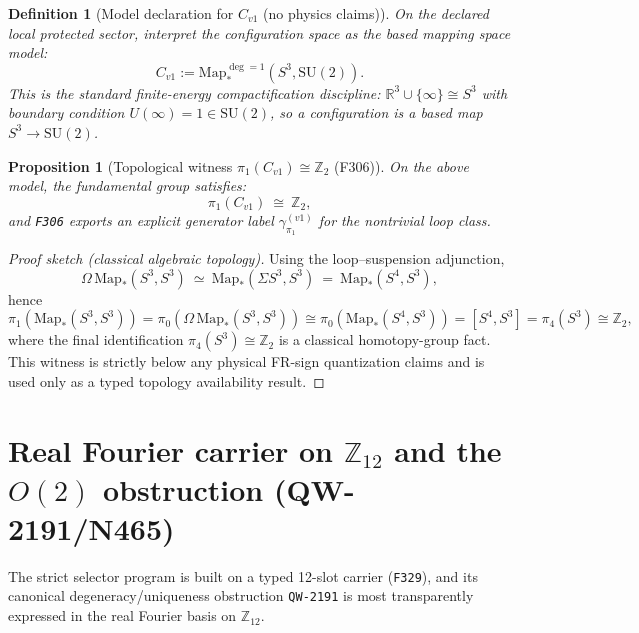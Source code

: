 \documentclass[11pt,a4paper]{article}
\newtheorem{proposition}[theorem]{Proposition}
\newtheorem{definition}{Definition}[section]
\begin{document}
\begin{definition}[Model declaration for $C_{v1}$ (no physics claims)]
On the declared local protected sector, interpret the configuration space as the based mapping space model:
\[
C_{v1} := \mathrm{Map}_*^{\deg=1}\!\left(S^3,\mathrm{SU}(2)\right).
\]
This is the standard finite-energy compactification discipline:
$\mathbb{R}^3\cup\{\infty\}\cong S^3$ with boundary condition $U(\infty)=1\in \mathrm{SU}(2)$, so a configuration is a based map $S^3\to \mathrm{SU}(2)$.
\end{definition}

\begin{proposition}[Topological witness $\pi_1(C_{v1})\cong\mathbb{Z}_2$ (F306)]
On the above model, the fundamental group satisfies:
\[
\pi_1(C_{v1})\ \cong\ \mathbb{Z}_2,
\]
and \texttt{F306} exports an explicit generator label $\gamma_{\pi_1}^{(v1)}$ for the nontrivial loop class.
\end{proposition}

\begin{proof}[Proof sketch (classical algebraic topology)]
Using the loop--suspension adjunction,
\[
\Omega\,\mathrm{Map}_*(S^3,S^3)\ \simeq\ \mathrm{Map}_*(\Sigma S^3,S^3)\ =\ \mathrm{Map}_*(S^4,S^3),
\]
hence
\[
\pi_1\!\left(\mathrm{Map}_*(S^3,S^3)\right)
=\pi_0\!\left(\Omega\,\mathrm{Map}_*(S^3,S^3)\right)
\cong \pi_0\!\left(\mathrm{Map}_*(S^4,S^3)\right)
=[S^4,S^3]
=\pi_4(S^3)
\cong \mathbb{Z}_2,
\]
where the final identification $\pi_4(S^3)\cong \mathbb{Z}_2$ is a classical homotopy-group fact.
This witness is strictly below any physical FR-sign quantization claims and is used only as a typed topology availability result.
\end{proof}

\section{Real Fourier carrier on \texorpdfstring{$\mathbb{Z}_{12}$}{Z\_12} and the \texorpdfstring{$O(2)$}{O(2)} obstruction (QW-2191/N465)}
\label{sec:fourier_z12_obstruction}

The strict selector program is built on a typed 12-slot carrier (\texttt{F329}), and its canonical degeneracy/uniqueness obstruction \texttt{QW-2191}
is most transparently expressed in the real Fourier basis on $\mathbb{Z}_{12}$.
\end{document}
